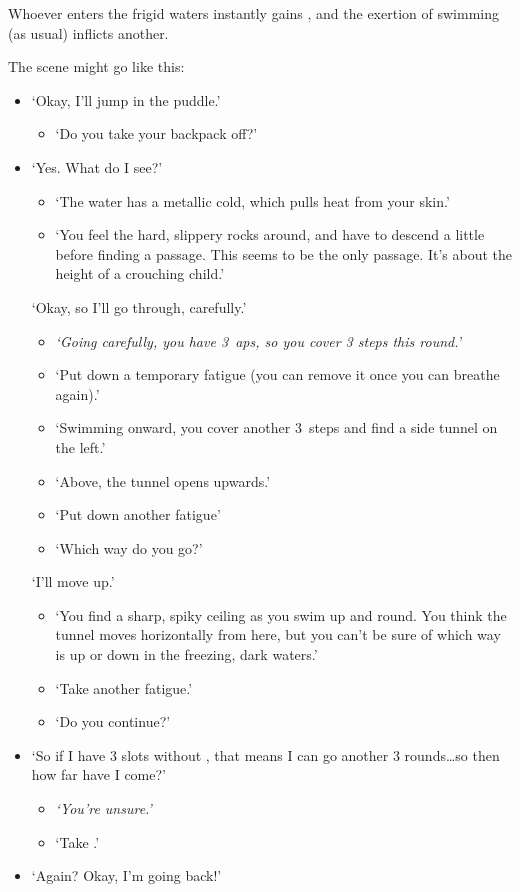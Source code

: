 \begin{multicols}{2}
Whoever enters the frigid waters instantly gains , and the exertion of swimming (as usual) inflicts another.

The scene might go like this:

\begin{itemize}
  \bf
  \item
  `Okay, I'll jump in the puddle.'
  \begin{itemize}
    \it
    \item
    `Do you take your backpack off?'
  \end{itemize}
  \item
  `Yes.
  What do I see?'
  \begin{itemize}
    \it
    \item
    `The water has a metallic cold, which pulls heat from your skin.'
    \item
    `You feel the hard, slippery rocks around, and have to descend a little before finding a passage.
    This seems to be the only passage.
    It's about the height of a crouching child.'
  \end{itemize}
  `Okay, so I'll go through, carefully.'
  \begin{itemize}
    \item
    \it
    `Going carefully, you have 3~\glspl{ap}, so you cover 3 steps this round.'
    \item
    `Put down a temporary \gls{fatigue} (you can remove it once you can breathe again).'
    \item
    `Swimming onward, you cover another 3~\glspl{step} and find a side tunnel on the left.'
    \item
    `Above, the tunnel opens upwards.'
    \item
    `Put down another \gls{fatigue}'
    \item
    `Which way do you go?'
  \end{itemize}
  `I'll move up.'
  \begin{itemize}
    \it
    \item
    `You find a sharp, spiky ceiling as you swim up and round.
    You think the tunnel moves horizontally from here, but you can't be sure of which way is up or down in the freezing, dark waters.'
    \item
    `Take another \gls{fatigue}.'
    \item
    `Do you continue?'
  \end{itemize}
  \item
  `So if I have 3 slots without , that means I can go another 3 rounds\ldots so then how far have I come?'
  \begin{itemize}
    \item
    \it
    `You're unsure.'
    \item
    `Take .'
  \end{itemize}
  \item
  `Again?
  Okay, I'm going back!'
\end{itemize}


\end{multicols}
